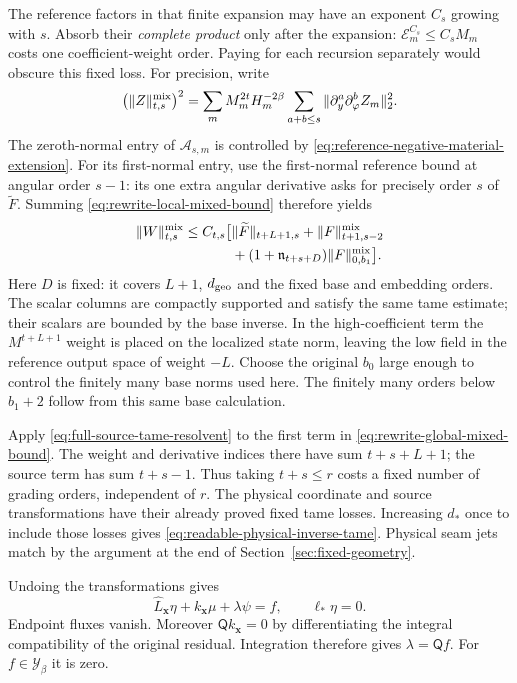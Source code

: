 The reference factors in that finite expansion may have an exponent
$C_s$ growing with $s$. Absorb their \emph{complete product} only
after the expansion: $\mathcal E_m^{C_s}\le C_sM_m$ costs one
coefficient-weight order. Paying for each recursion separately
would obscure this fixed loss.
For precision, write
\[
 \bigl(\|Z\|_{t,s}^{\rm mix}\bigr)^2
 =\sum_m M_m^{2t}H_m^{-2\beta}
       \sum_{a+b\le s}\|\partial_y^a\partial_\varphi^b Z_m\|_2^2.
\]
The zeroth-normal entry of $\mathcal A_{s,m}$ is controlled by
\eqref{eq:reference-negative-material-extension}. For its
first-normal entry, use the first-normal reference bound at angular
order $s-1$: its one extra angular derivative asks for precisely
order $s$ of $\widetilde F$. Summing
\eqref{eq:rewrite-local-mixed-bound} therefore yields
\begin{equation}\label{eq:rewrite-global-mixed-bound}
 \begin{split}
 \|W\|_{t,s}^{\rm mix}
 \le C_{t,s}\bigl[&
   \|\widetilde F\|_{t+L+1,s}
   +\|F\|_{t+1,s-2}^{\rm mix}\\
 &+(1+\mathfrak n_{t+s+D})\|F\|_{0,b_1}^{\rm mix}\bigr].
 \end{split}
\end{equation}
Here $D$ is fixed: it covers $L+1$, $d_{\rm geo}$ and the fixed
base and embedding orders. The scalar columns are compactly
supported and satisfy the same tame estimate; their scalars are
bounded by the base inverse. In the high-coefficient term the
$M^{t+L+1}$ weight is placed on the localized state norm, leaving
the low field in the reference output space of weight $-L$.
Choose the original $b_0$ large enough to control the finitely many
base norms used here. The finitely many orders below $b_1+2$ follow
from this same base calculation.

Apply \eqref{eq:full-source-tame-resolvent} to the first term in
\eqref{eq:rewrite-global-mixed-bound}. The weight and derivative
indices there have sum $t+s+L+1$; the source term has sum $t+s-1$.
Thus taking $t+s\le r$ costs a fixed number of grading orders,
independent of $r$. The physical coordinate and source transformations
have their already proved fixed tame losses. Increasing $d_*$
once to include those losses gives \eqref{eq:readable-physical-inverse-tame}.
Physical seam jets match by the argument at the end of
Section~\ref{sec:fixed-geometry}.

Undoing the transformations gives
\[
 \widehat L_{\mathbf x}\eta+k_{\mathbf x}\mu+\lambda\psi=f,
 \qquad \ell_*\eta=0.
\]
Endpoint fluxes vanish. Moreover $\mathsf Qk_{\mathbf x}=0$ by
differentiating the integral compatibility of the original residual.
Integration therefore gives $\lambda=\mathsf Qf$. For
$f\in\mathcal Y_\beta$ it is zero.

